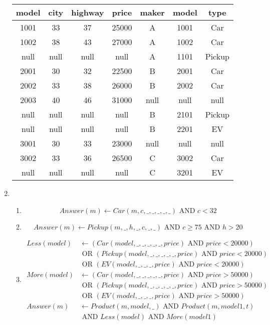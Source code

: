 \documentclass[12pt,letterpaper]{article}
\newcommand{\AND}[0]{\text{ AND }}
\newcommand{\OR}[0]{\text{ OR }}
\begin{document}
\begin{enumerate}
      \begin{tabular}{c | c | c | c | c | c | c}
         model & city & highway & price & maker & model & type \\
        \hline
        \hline
          1001 & 33   & 37      & 25000 & A     & 1001  & Car    \\
          1002 & 38   & 43      & 27000 & A     & 1002  & Car    \\
          null & null & null    & null  & A     & 1101  & Pickup \\
          2001 & 30   & 32      & 22500 & B     & 2001  & Car    \\
          2002 & 33   & 38      & 26000 & B     & 2002  & Car    \\
          2003 & 40   & 46      & 31000 & null  & null  & null   \\
          null & null & null    & null  & B     & 2101  & Pickup \\
          null & null & null    & null  & B     & 2201  & EV     \\
          3001 & 30   & 33      & 23000 & null  & null  & null   \\
          3002 & 33   & 36      & 26500 & C     & 3002  & Car    \\
          null & null & null    & null  & C     & 3201  & EV     \\
      \end{tabular}

    \item
      \begin{enumerate}
        \item
          \[
            Answer(m) \leftarrow Car(m, c, \_, \_, \_, \_, \_) \AND c < 32
          \]

        \item
          \[
            Answer(m) \leftarrow Pickup(m, \_, h, \_, c, \_, \_) \AND c \ge 75 \AND h > 20
          \]
        \item
          \begin{align*}
            Less(model) &\leftarrow (Car(model, \_, \_, \_, \_, \_, price) \AND price < 20000) \\
            &\OR (Pickup(model, \_, \_, \_, \_, \_, price) \AND price < 20000) \\
            &\OR (EV(model, \_, \_, \_, price) \AND price < 20000) \\
            More(model) &\leftarrow (Car(model, \_, \_, \_, \_, \_, price) \AND price > 50000) \\
            &\OR (Pickup(model, \_, \_, \_, \_, \_, price) \AND price > 50000) \\
            &\OR (EV(model, \_, \_, \_, price) \AND price > 50000) \\
            Answer(m) &\leftarrow Product(m, model, \_) \AND Product(m, model1, t) \\
            &\AND Less(model) \AND More(model1)
          \end{align*}


\end{enumerate}
\end{enumerate}
\end{document}
